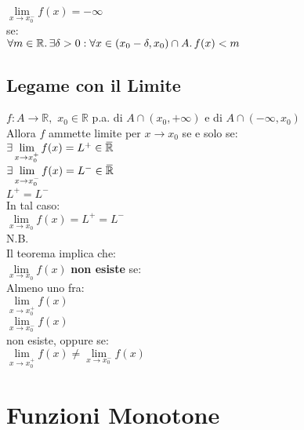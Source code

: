 \documentclass[a4paper, twoside, italian, 11pt]{book}
\newcommand{\overbar}[1] {\mkern 1.5mu\overline{\mkern-1.5mu#1\mkern-1.5mu}\mkern 1.5mu}
\newcommand{\R}{\mathbb{R}}
\begin{document}
$\lim\limits_{x \to x_0^-} f(x) = -\infty$ \\

\noindent
se: \\

$\forall m \in \R \ldotp \exists \delta > 0 : \forall x \in (x_0 - \delta, x_0) \cap A \ldotp f(x) < m$


\subsection{Legame con il Limite}

\noindent
$f : A \rightarrow \R,$ $x_0 \in \R$ p.a. di $A \cap (x_0, +\infty)$ e di $A \cap (-\infty, x_0)$ \\

\noindent
Allora $f$ ammette limite per $x \to x_0$ se e solo se: \\

$\exists \lim\limits_{x \to x_0^+} f(x) = L^+ \in \overbar\R$ \\

$\exists \lim\limits_{x \to x_0^-} f(x) = L^- \in \overbar\R$ \\

$L^+ = L^-$ \\

\noindent
In tal caso: \\

$\lim\limits_{x \to x_0} f(x) = L^+ = L^-$ \\

\noindent
N.B. \\
Il teorema implica che: \\

$\lim\limits_{x \to x_0} f(x)$ \textbf{non esiste} se: \\

\noindent
Almeno uno fra: \\

$\lim\limits_{x \to x_0^+} f(x)$ \\

$\lim\limits_{x \to x_0^-} f(x)$ \\

\noindent
non esiste, oppure se: \\

$\lim\limits_{x \to x_0^+} f(x) \neq \lim\limits_{x \to x_0^-} f(x)$



\section{Funzioni Monotone}
\end{document}
